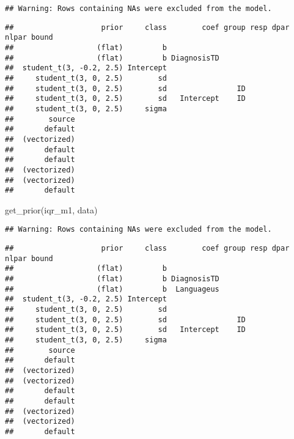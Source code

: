 \documentclass[
]{article}
\newenvironment{Shaded}{\begin{snugshade}}{\end{snugshade}}
\newcommand{\FunctionTok}[1]{\textcolor[rgb]{0.00,0.00,0.00}{#1}}
\newcommand{\NormalTok}[1]{#1}
\begin{document}
\begin{verbatim}
## Warning: Rows containing NAs were excluded from the model.
\end{verbatim}

\begin{verbatim}
##                    prior     class        coef group resp dpar nlpar bound
##                   (flat)         b                                        
##                   (flat)         b DiagnosisTD                            
##  student_t(3, -0.2, 2.5) Intercept                                        
##     student_t(3, 0, 2.5)        sd                                        
##     student_t(3, 0, 2.5)        sd                ID                      
##     student_t(3, 0, 2.5)        sd   Intercept    ID                      
##     student_t(3, 0, 2.5)     sigma                                        
##        source
##       default
##  (vectorized)
##       default
##       default
##  (vectorized)
##  (vectorized)
##       default
\end{verbatim}

\begin{Shaded}
\begin{Highlighting}[]
\FunctionTok{get\_prior}\NormalTok{(iqr\_m1, data)}
\end{Highlighting}
\end{Shaded}

\begin{verbatim}
## Warning: Rows containing NAs were excluded from the model.
\end{verbatim}

\begin{verbatim}
##                    prior     class        coef group resp dpar nlpar bound
##                   (flat)         b                                        
##                   (flat)         b DiagnosisTD                            
##                   (flat)         b  Languageus                            
##  student_t(3, -0.2, 2.5) Intercept                                        
##     student_t(3, 0, 2.5)        sd                                        
##     student_t(3, 0, 2.5)        sd                ID                      
##     student_t(3, 0, 2.5)        sd   Intercept    ID                      
##     student_t(3, 0, 2.5)     sigma                                        
##        source
##       default
##  (vectorized)
##  (vectorized)
##       default
##       default
##  (vectorized)
##  (vectorized)
##       default
\end{verbatim}
\end{document}
